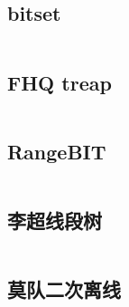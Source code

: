 \documentclass[titlepage, a4paper]{article}
\begin{document}
\begin{multicols}{2}
\begin{spacing}{0.6}
				\subsection{bitset}
					\inputminted{cpp}{src/DataStructure/bitset.cpp}
				\subsection{FHQ treap}
					\inputminted{cpp}{src/DataStructure/FHQ_treap.cpp}
				\subsection{RangeBIT}
					\inputminted{cpp}{src/DataStructure/RangeBIT.cpp}
				\subsection{李超线段树}
					\inputminted{cpp}{src/DataStructure/李超线段树.cpp}
				\subsection{莫队二次离线}
					\inputminted{cpp}{src/DataStructure/莫队二次离线.cpp}

\end{spacing}
\end{multicols}
\end{document}
